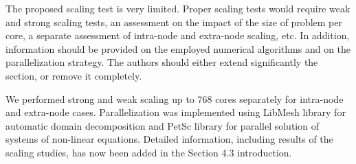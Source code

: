 \documentclass[answers,11pt]{exam}
\begin{document}
\begin{questions}
\question The proposed scaling test is very limited. Proper scaling tests would
require weak and strong scaling tests, an assessment on the impact of the size
of problem per core, a separate assessment of intra-node and extra-node scaling,
etc. In addition, information should be provided on the employed numerical
algorithms and on the parallelization strategy. The authors should either extend
significantly the section, or remove it completely.
\begin{solution}
        We performed strong and weak scaling up to 768 cores separately for
        intra-node and extra-node cases. Parallelization was implemented using
        LibMesh library for automatic domain decomposition and PetSc
        library for parallel solution of systems of non-linear equations.
        Detailed information, including results of the scaling studies, has now
        been added in the Section 4.3 introduction.
\end{solution}


\end{questions}


  
\end{document}
